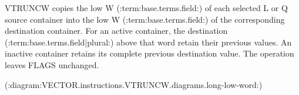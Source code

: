 VTRUNCW copies the low W (:term:base.terms.field:) of each selected L or Q source container into the
low W (:term:base.terms.field:) of the corresponding destination container.  For an active
container, the destination (:term:base.terms.field|plural:) above that word retain their previous values.
An inactive container retains its complete previous destination value.  The
operation leaves FLAGS unchanged.

(:diagram:VECTOR.instructions.VTRUNCW.diagrams.long-low-word:)
